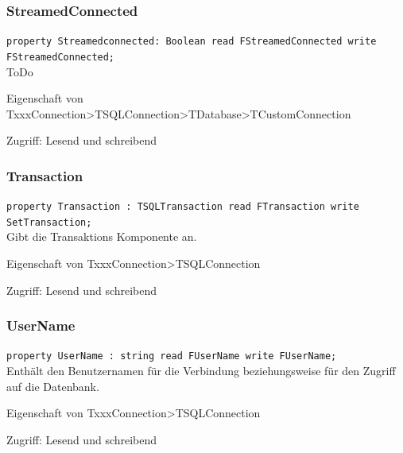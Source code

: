 \subsubsection{StreamedConnected}
\begin{description}
  \item \texttt{property Streamedconnected: Boolean read FStreamedConnected write FStreamedConnected;}\\ToDo
  \begin{description}
    \item Eigenschaft von TxxxConnection>TSQLConnection>TDatabase>TCustomConnection
  \end{description}
  \begin{description}
    \item Zugriff: Lesend und schreibend
  \end{description}
\end{description}

\subsubsection{Transaction}
\begin{description}
  \item \texttt{property Transaction : TSQLTransaction read FTransaction write SetTransaction;}\\Gibt die Transaktions Komponente an.
  \begin{description}
    \item Eigenschaft von TxxxConnection>TSQLConnection
  \end{description}
  \begin{description}
    \item Zugriff: Lesend und schreibend
  \end{description}
\end{description}

\subsubsection{UserName}
\begin{description}
  \item \texttt{property UserName : string read FUserName write FUserName;}\\Enthält den Benutzernamen für die Verbindung beziehungsweise für den Zugriff auf die Datenbank.
  \begin{description}
    \item Eigenschaft von TxxxConnection>TSQLConnection
  \end{description}
  \begin{description}
    \item Zugriff: Lesend und schreibend
  \end{description}
\end{description}

